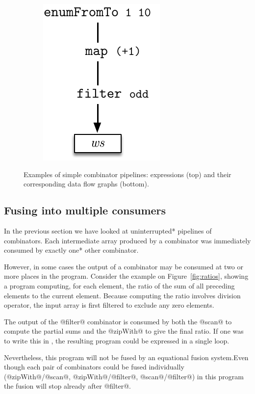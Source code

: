 \documentclass[preamble.tex]{subfiles}
\begin{document}
\begin{figure}
\begin{subfigure}{.33\textwidth}
\includegraphics[center,scale=\omniscale]{img/DFD-simple-pipeline-c}%
\end{subfigure}%

\caption{Examples of simple combinator pipelines: \Haskell expressions (top) and their corresponding data flow graphs (bottom).}
\label{fig:simple-piplines}
\end{figure}


\subsection{Fusing into multiple consumers}
\label{sec:multiple-consumers}

In the previous section we have looked at \*uninterrupted* pipelines of combinators. Each intermediate array produced by a combinator was immediately consumed by \*exactly one* other combinator.

However, in some cases the output of a combinator may be consumed at two or more places in the program. Consider the example on Figure~\ref{fig:ratios}, showing a program computing, for each element, the ratio of the sum of all preceding elements to the current element. Because computing the ratio involves division operator, the input array is first filtered to exclude any zero elements.

The output of the @filter@ combinator is consumed by both the @scan@ to compute the partial sums and the @zipWith@ to give the final ratio. If one was to write this in \C, the resulting program could be expressed in a single loop.

Nevertheless, this program will not be fused by an equational fusion system.\ieqf Even though each pair of combinators could be fused individually (@zipWith@/@scan@, @zipWith@/@filter@, @scan@/@filter@) in this program the fusion will stop already after @filter@.
\end{document}
